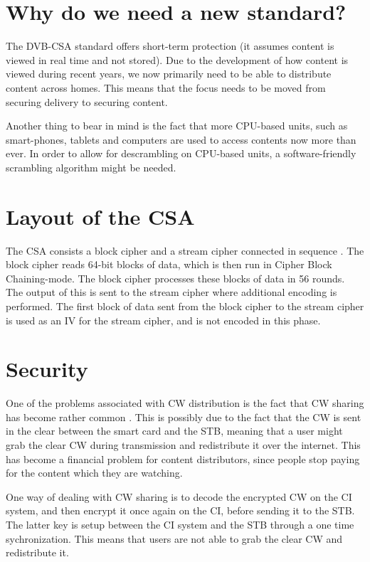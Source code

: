 \section{Why do we need a new standard?}
The DVB-CSA standard offers short-term protection (it assumes content is viewed 
in real time and not stored). Due to the development of how content is viewed 
during recent years, we now primarily need to be able to distribute content 
across homes. This means that the focus needs to be moved from securing delivery 
to securing content. \citep{Farncombe}

Another thing to bear in mind is the fact that more CPU-based units, such as 
smart-phones, tablets and computers are used to access contents now more than 
ever. In order to allow for descrambling on CPU-based units, a software-friendly 
scrambling algorithm might be needed.

\section{Layout of the CSA}
The CSA consists a block cipher and a stream cipher connected in sequence 
\citep[p. 271]{WeiLi:2007}. The block cipher reads 64-bit blocks of data, which 
is then run in Cipher Block Chaining-mode. The block cipher processes these 
blocks of data in 56 rounds. The output of this is sent to the stream cipher 
where additional encoding is performed. The first block of data sent from the 
block cipher to the stream cipher is used as an IV for the stream cipher, and is 
not encoded in this phase. \citep{DVBAnalysis:2006}

\section{Security}
One of the problems associated with CW distribution is the fact that CW sharing 
has become rather common \citep{Farncombe}. This is possibly due to the fact that
the CW is sent in the clear between the smart card and the STB, meaning that a 
user might grab the clear CW during transmission and redistribute it over the 
internet. This has become a financial problem for content distributors, since 
people stop paying for the content which they are watching.

One way of dealing with CW sharing is to decode the encrypted CW on the CI 
system, and then encrypt it once again on the CI, before sending it to the STB. 
The latter key is setup between the CI system and the STB  through a one time
sychronization. This means that users are not able to grab the clear CW and 
redistribute it. \citep[pp. 12--13]{HIS:2011}

